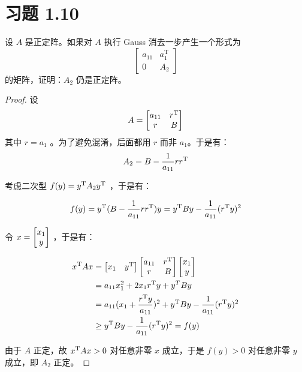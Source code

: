 \documentclass{article}
\begin{document}
\section{习题 1.10}
设 $A$ 是正定阵。如果对 $A$ 执行 Gauss 消去一步产生一个形式为
\[
  \begin{bmatrix}
    a_{11} & a_1^{\mathrm{T}} \\
    0 & A_2
  \end{bmatrix}
\]
的矩阵，证明：$A_2$ 仍是正定阵。

\begin{proof}
  设
  \[
    A =
    \begin{bmatrix}
      a_{11} & r^{\mathrm{T}} \\
      r & B
    \end{bmatrix}
  \]
  其中 $r = a_1$ 。为了避免混淆，后面都用 $r$ 而非 $a_1$。于是有：
  \[
    A_2 = B - \frac{1}{a_{11}}r r^{\mathrm{T}}
  \]

  考虑二次型 $f(y) = y^{\mathrm{T}} A_2 y^{\mathrm{T}}$ ，于是有：

  \[
    f(y) = y^{\mathrm{T}} (B - \frac{1}{a_{11}} r r^{\mathrm{T}}) y = y^{\mathrm{T}}By - \frac{1}{a_{11}} (r^{\mathrm{T}}y)^2
  \]

  令 $x = \begin{bmatrix} x_1 \\ y \end{bmatrix}$ ，于是有：

  \[
    \begin{aligned}
      x^{\mathrm{T}}Ax &= \begin{bmatrix} x_1 & y^{\mathrm{T}} \end{bmatrix}
      \begin{bmatrix}
        a_{11} & r^{\mathrm{T}} \\
        r & B
      \end{bmatrix} \begin{bmatrix} x_1 \\ y \end{bmatrix} \\
      &= a_{11} x_1^2 + 2x_1 r^{\mathrm{T}} y + y^T B y \\
      &= a_{11} (x_1 + \frac{r^{\mathrm{T}}y}{a_{11}})^2 + y^{\mathrm{T}} B y - \frac{1}{a_{11}} (r^{\mathrm{T}}y)^2 \\
      &\geq y^{\mathrm{T}} B y - \frac{1}{a_{11}} (r^{\mathrm{T}}y)^2 = f(y)
    \end{aligned}
  \]

  由于 $A$ 正定，故 $x^{\mathrm{T}} A x > 0$ 对任意非零 $x$ 成立，于是 $f(y) > 0$ 对任意非零 $y$ 成立，即 $A_2$ 正定。

\end{proof}
\end{document}
